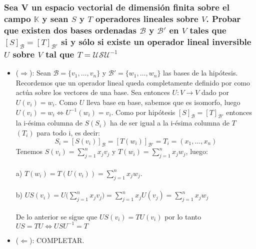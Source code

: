 \documentclass{article}
\begin{document}
\subsubsection{Sea V un espacio vectorial de dimensión finita sobre el campo $\mathbb{K}$ y sean $S$ y $T$ operadores
lineales sobre $V$. Probar que existen dos bases ordenadas $\mathcal{B}$ y $\mathcal{B}'$ en $V$ tales que 
$[S]_{\mathcal{B}} = [T]_{\mathcal{B}'}$ si y sólo si existe un operador lineal inversible $U$ sobre $V$ tal que 
$T=\mathcal{USU}^{-1}$}
\begin{itemize}
\item
	($\Rightarrow$): Sean $\mathcal{B} = \{ v_1,\dots,v_n \}$ y $\mathcal{B}' = \{ w_1,\dots,w_n\}$ las bases de la 
	hipótesis. Recordemos que un operador lineal queda completamente definido por como actúa sobre los vectores
	de una base. Sea entonces $U: V \rightarrow V$ dado por $U(v_i) = w_i$. Como $U$ lleva base en base, sabemos que
	es isomorfo, luego $U(v_i)=w_i \Longleftrightarrow U^{-1}(w_i)=v_i$. Como por hipótesis 
	$[S]_{\mathcal{B}} = [T]_{\mathcal{B}'}$ entonces la i-ésima columna de $S(S_i)$ ha de ser igual a la i-ésima
	columna de $T$ $(T_i)$ para todo i, es decir:
	\[
		S_i = [S(v_i)]_\mathcal{B} = [T(w_i)]_{\mathcal{B}'} = T_i = (x_1,\dots,x_n)
	\]
	Tenemos $S(v_i) = \sum_{j=1}^{n}{x_jv_j}$ y $T(w_i) = \sum_{j=1}^{n}{x_jw_j}$, luego: \\ \\
	a) $T(w_i) = T(U(v_i)) = \sum_{j=1}^{n}{x_jw_j}$. \\ \\
	b) $US(v_i) = U\Big( \sum_{j=1}^{n}{x_jv_j} \Big) = \sum_{j=1}^{n}{x_jU(v_j)} = \sum_{j=1}^{n}{x_jw_j}$ \\
	\\ De lo anterior se sigue que $US(v_i) = TU(v_i)$ por lo tanto $US = TU \Longleftrightarrow {USU}^{-1} = T$
	\item
	($\Leftarrow$): COMPLETAR.
\end{itemize}
\end{document}
